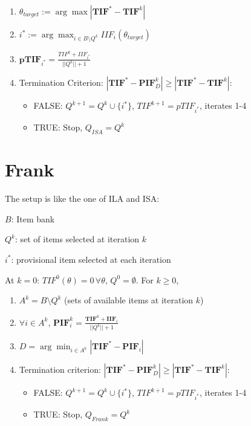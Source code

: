\documentclass[12pt, a4paper, titilepage]{article}
\begin{document}
\begin{enumerate}
	\item $\theta_{target} := \arg \max |\mathbf{TIF}^* - \mathbf{TIF}^{k}|$
	\item $i^* := \arg \max_{i \in B\setminus Q^k} IIF_i(\theta_{target})$
	\item $\mathbf{pTIF}_{i^*} = \frac{TIF^k + IIF_{i^*}}{||Q^{k}|| + 1}$
	\item Termination Criterion: $|\mathbf{TIF}^* - \mathbf{PIF}_D^k| \geq |\mathbf{TIF}^* - \mathbf{TIF}^{k}|$: 
	\begin{itemize}
		\item FALSE:  $Q^{k+1} = Q^{k} \cup \{i^*\}$, $TIF^{k+1} = pTIF_{i^*}$, iterates 1-4 
\item TRUE: Stop, %
$Q_{ISA} = Q^k$
	\end{itemize}
\end{enumerate}



\section{Frank}


The setup is like the one of ILA and ISA: 

$B$: Item bank 

$Q^k$: set of items selected at iteration $k$

$i^*$: provisional item selected at each iteration


At $k = 0$: $TIF^0(\theta) = 0 \, \forall \theta$, $Q^0 = \emptyset$. For $k \geq 0$,

\begin{enumerate}
	\item  $A^k = B \setminus Q^k$ (sets of available items at iteration $k$)
	\item $\forall i \in A^k$, $\mathbf{PIF}_{i}^k = \frac{\mathbf{TIF}^k + \mathbf{IIF}_{i}}{||Q^k||+1}$
	\item $D = \arg \min_{i \in A^k} |\mathbf{TIF}^* - \mathbf{PIF}_i|$
	\item Termination criterion: $|\mathbf{TIF}^* - \mathbf{PIF}_D^{k}| \geq |\mathbf{TIF}^* - \mathbf{TIF}^{k}|$: 
	\begin{itemize}
		\item FALSE:  $Q^{k+1} = Q^{k} \cup \{i^*\}$, $TIF^{k+1} = pTIF_{i^*}$, iterates 1-4 
\item TRUE: Stop, %
$Q_{Frank} = Q^k$
		
	\end{itemize}
\end{enumerate}
\end{document}
